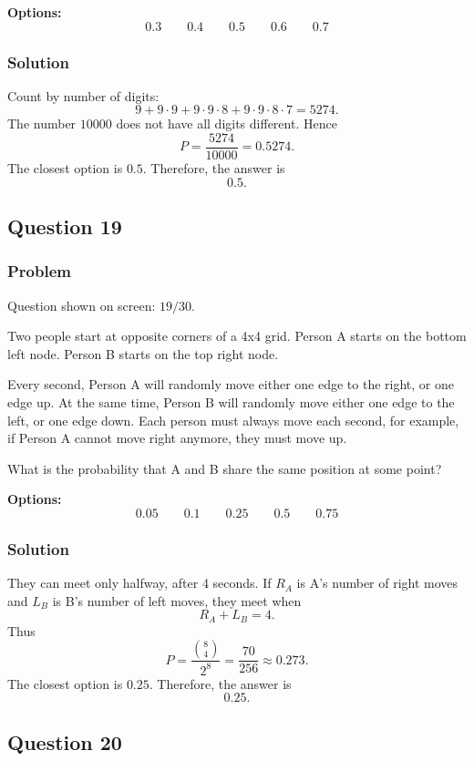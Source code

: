 \documentclass[12pt]{article}
\begin{document}
\noindent\textbf{Options:}
\[
\boxed{0.3}
\qquad
\boxed{0.4}
\qquad
\boxed{0.5}
\qquad
\boxed{0.6}
\qquad
\boxed{0.7}
\]

\subsubsection{Solution}
Count by number of digits:
\[
9+9\cdot 9+9\cdot 9\cdot 8+9\cdot 9\cdot 8\cdot 7
=5274.
\]
The number \(10000\) does not have all digits different. Hence
\[
P=\frac{5274}{10000}=0.5274.
\]
The closest option is \(0.5\). Therefore, the answer is
\[
\boxed{0.5}.
\]

\subsection{Question 19}
\subsubsection{Problem}
Question shown on screen: \(19/30\).

Two people start at opposite corners of a 4x4 grid. Person A starts on the bottom left node. Person B starts on the top right node.

Every second, Person A will randomly move either one edge to the right, or one edge up. At the same time, Person B will randomly move either one edge to the left, or one edge down. Each person must always move each second, for example, if Person A cannot move right anymore, they must move up.

What is the probability that A and B share the same position at some point?

\noindent\textbf{Options:}
\[
\boxed{0.05}
\qquad
\boxed{0.1}
\qquad
\boxed{0.25}
\qquad
\boxed{0.5}
\qquad
\boxed{0.75}
\]

\subsubsection{Solution}
They can meet only halfway, after 4 seconds. If \(R_A\) is A's number of right moves and \(L_B\) is B's number of left moves, they meet when
\[
R_A+L_B=4.
\]
Thus
\[
P=\frac{\binom{8}{4}}{2^8}=\frac{70}{256}\approx 0.273.
\]
The closest option is \(0.25\). Therefore, the answer is
\[
\boxed{0.25}.
\]

\subsection{Question 20}
\end{document}
